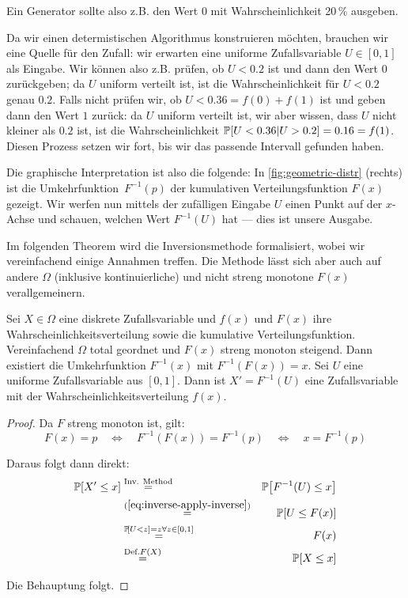 \noindent Ein Generator sollte also z.B. den Wert $0$ mit Wahrscheinlichkeit 20\,\% ausgeben.

Da wir einen determistischen Algorithmus konstruieren möchten, brauchen wir eine Quelle für den Zufall:
wir erwarten eine uniforme Zufallsvariable $U \in [0, 1]$ als Eingabe.
Wir können also z.B. prüfen, ob $U < 0.2$ ist und dann den Wert $0$ zurückgeben; da $U$ uniform verteilt ist, ist die Wahrscheinlichkeit für $U < 0.2$ genau $0.2$.
Falls nicht prüfen wir, ob $U < 0.36 = f(0) + f(1)$ ist und geben dann den Wert $1$ zurück: da $U$ uniform verteilt ist, wir aber wissen, dass $U$ nicht kleiner als $0.2$ ist,
ist die Wahrscheinlichkeit $\mathbb{P}\!\left[U < 0.36 | U > 0.2\right] = 0.16 = f(1)$.
Diesen Prozess setzen wir fort, bis wir das passende Intervall gefunden haben.

Die graphische Interpretation ist also die folgende:
In \cref{fig:geometric-distr} (rechts) ist die Umkehrfunktion~$F^{-1}(p)$ der kumulativen Verteilungsfunktion $F(x)$ gezeigt.
Wir werfen nun mittels der zufälligen Eingabe $U$ einen Punkt auf der $x$-Achse und schauen, welchen Wert $F^{-1}(U)$ hat --- dies ist unsere Ausgabe.

Im folgenden Theorem wird die Inversionsmethode formalisiert, wobei wir vereinfachend einige Annahmen treffen.
Die Methode lässt sich aber auch auf andere $\Omega$ (inklusive kontinuierliche) und nicht streng monotone $F(x)$ verallgemeinern.

\begin{theorem}
    Sei $X \in \Omega$ eine diskrete Zufallsvariable und $f(x)$ und $F(x)$ ihre Wahrscheinlichkeitsverteilung sowie die kumulative Verteilungsfunktion.
    Vereinfachend $\Omega$ total geordnet und $F(x)$ streng monoton steigend.
    Dann existiert die Umkehrfunktion $F^{-1}(x)$ mit $F^{-1}(F(x)) = x$.
    Sei $U$ eine uniforme Zufallsvariable aus $[0, 1]$.
    Dann ist $X' = F^{-1}(U)$ eine Zufallsvariable mit der Wahrscheinlichkeitsverteilung $f(x)$.
\end{theorem}

\begin{proof}
    \noindent Da $F$ streng monoton ist, gilt:
    \begin{equation}\label{eq:inverse-apply-inverse}
        F(x) = p
        \quad\Leftrightarrow\quad F^{-1}(F(x)) = F^{-1}(p)
        \quad\Leftrightarrow\quad x = F^{-1}(p)
    \end{equation}

    \noindent Daraus folgt dann direkt:
    \begin{eqnarray}
        \mathbb{P}\!\left[X' \le x\right] &\stackrel{\text{Inv. Method}} = & \mathbb{P}\!\left[F^{-1}(U) \le x\right] \\
        &\stackrel{(\ref{eq:inverse-apply-inverse})}{=}& \mathbb{P}\!\left[U \le F(x)\right] \\
        &\stackrel{\mathbb{P}\!\left[U < z\right] = z \forall z \in [0, 1]}=& F(x) \\
        &\stackrel{\text{Def.} F(X)}=& \mathbb{P}\!\left[X \le x\right]
    \end{eqnarray}

    \noindent Die Behauptung folgt.
\end{proof}


